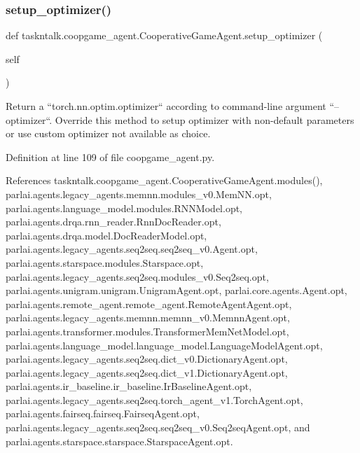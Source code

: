 \subsubsection{\texorpdfstring{setup\+\_\+optimizer()}{setup\_optimizer()}}
{\footnotesize\ttfamily def taskntalk.\+coopgame\+\_\+agent.\+Cooperative\+Game\+Agent.\+setup\+\_\+optimizer (\begin{DoxyParamCaption}\item[{}]{self }\end{DoxyParamCaption})}

\begin{DoxyVerb}Return a ``torch.nn.optim.optimizer`` according to command-line
argument ``--optimizer``. Override this method to setup optimizer with
non-default parameters or use custom optimizer not available as choice.
\end{DoxyVerb}
 

Definition at line 109 of file coopgame\+\_\+agent.\+py.



References taskntalk.\+coopgame\+\_\+agent.\+Cooperative\+Game\+Agent.\+modules(), parlai.\+agents.\+legacy\+\_\+agents.\+memnn.\+modules\+\_\+v0.\+Mem\+N\+N.\+opt, parlai.\+agents.\+language\+\_\+model.\+modules.\+R\+N\+N\+Model.\+opt, parlai.\+agents.\+drqa.\+rnn\+\_\+reader.\+Rnn\+Doc\+Reader.\+opt, parlai.\+agents.\+drqa.\+model.\+Doc\+Reader\+Model.\+opt, parlai.\+agents.\+legacy\+\_\+agents.\+seq2seq.\+seq2seq\+\_\+v0.\+Agent.\+opt, parlai.\+agents.\+starspace.\+modules.\+Starspace.\+opt, parlai.\+agents.\+legacy\+\_\+agents.\+seq2seq.\+modules\+\_\+v0.\+Seq2seq.\+opt, parlai.\+agents.\+unigram.\+unigram.\+Unigram\+Agent.\+opt, parlai.\+core.\+agents.\+Agent.\+opt, parlai.\+agents.\+remote\+\_\+agent.\+remote\+\_\+agent.\+Remote\+Agent\+Agent.\+opt, parlai.\+agents.\+legacy\+\_\+agents.\+memnn.\+memnn\+\_\+v0.\+Memnn\+Agent.\+opt, parlai.\+agents.\+transformer.\+modules.\+Transformer\+Mem\+Net\+Model.\+opt, parlai.\+agents.\+language\+\_\+model.\+language\+\_\+model.\+Language\+Model\+Agent.\+opt, parlai.\+agents.\+legacy\+\_\+agents.\+seq2seq.\+dict\+\_\+v0.\+Dictionary\+Agent.\+opt, parlai.\+agents.\+legacy\+\_\+agents.\+seq2seq.\+dict\+\_\+v1.\+Dictionary\+Agent.\+opt, parlai.\+agents.\+ir\+\_\+baseline.\+ir\+\_\+baseline.\+Ir\+Baseline\+Agent.\+opt, parlai.\+agents.\+legacy\+\_\+agents.\+seq2seq.\+torch\+\_\+agent\+\_\+v1.\+Torch\+Agent.\+opt, parlai.\+agents.\+fairseq.\+fairseq.\+Fairseq\+Agent.\+opt, parlai.\+agents.\+legacy\+\_\+agents.\+seq2seq.\+seq2seq\+\_\+v0.\+Seq2seq\+Agent.\+opt, and parlai.\+agents.\+starspace.\+starspace.\+Starspace\+Agent.\+opt.

